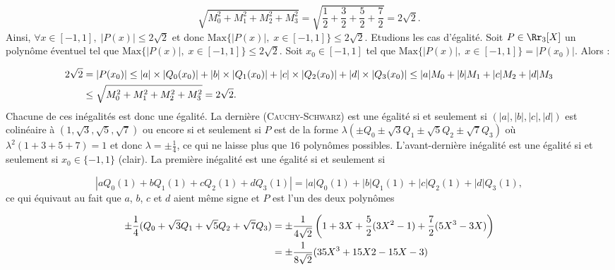 {{$$\sqrt{M_0^2+M_1^2+M_2^2+M_3^2}=\sqrt{\frac{1}{2}+\frac{3}{2}+\frac{5}{2}+\frac{7}{2}}=2\sqrt{2}.$$
Ainsi, $\forall x\in[-1,1],\;|P(x)|\leq2\sqrt{2}$ et donc $\mbox{Max}\{|P(x)|,\;x\in[-1,1]\}\leq2\sqrt{2}$.
Etudions les cas d'égalité. Soit $P\in\Rr_3[X]$ un polynôme éventuel tel que $\mbox{Max}\{|P(x)|,\;x\in[-1,1]\}\leq2\sqrt{2}$.
Soit $x_0\in[-1,1]$ tel que $\mbox{Max}\{|P(x)|,\;x\in[-1,1]\}=|P(x_0)|$. Alors :

\begin{align*}\ensuremath
2\sqrt{2}&=|P(x_0)|\leq|a|\times|Q_0(x_0)|+|b|\times|Q_1(x_0)|+|c|\times|Q_2(x_0)|+|d|\times|Q_3(x_0)|\leq|a|M_0+|b|M_1+|c|M_2+|d|M_3\\
 &\leq\sqrt{M_0^2+M_1^2+M_2^2+M_3^2}=2\sqrt{2}.
\end{align*}
Chacune de ces inégalités est donc une égalité. La dernière (\textsc{Cauchy}-\textsc{Schwarz}) est une égalité si et seulement si $(|a|,|b|,|c|,|d|)$ est colinéaire à $(1,\sqrt{3},\sqrt{5},\sqrt{7})$ ou encore si et seulement si $P$ est de la forme $\lambda(\pm Q_0\pm\sqrt{3}Q_1\pm\sqrt{5}Q_2\pm\sqrt{7}Q_3)$ où $\lambda^2(1+3+5+7)=1$ et donc $\lambda=\pm\frac{1}{4}$, ce qui ne laisse plus que $16$ polynômes possibles. L'avant-dernière inégalité est une égalité si et seulement si $x_0\in\{-1,1\}$ (clair). La première inégalité est une égalité si et seulement si 

$$|aQ_0(1)+bQ_1(1)+cQ_2(1)+dQ_3(1)|=|a|Q_0(1)+|b|Q_1(1)+|c|Q_2(1)+|d|Q_3(1),$$
ce qui équivaut au fait que $a$, $b$, $c$ et $d$ aient même signe et $P$ est l'un des deux polynômes
 
\begin{align*}\ensuremath
\pm\frac{1}{4}(Q_0+\sqrt{3}Q_1+\sqrt{5}Q_2+\sqrt{7}Q_3)&=\pm\frac{1}{4\sqrt{2}}\left(1+3X+\frac{5}{2}(3X^2-1)
+\frac{7}{2}(5X^3-3X)\right)\\
 &=\pm\frac{1}{8\sqrt{2}}(35X^3+15X2-15X-3)
\end{align*}}
}